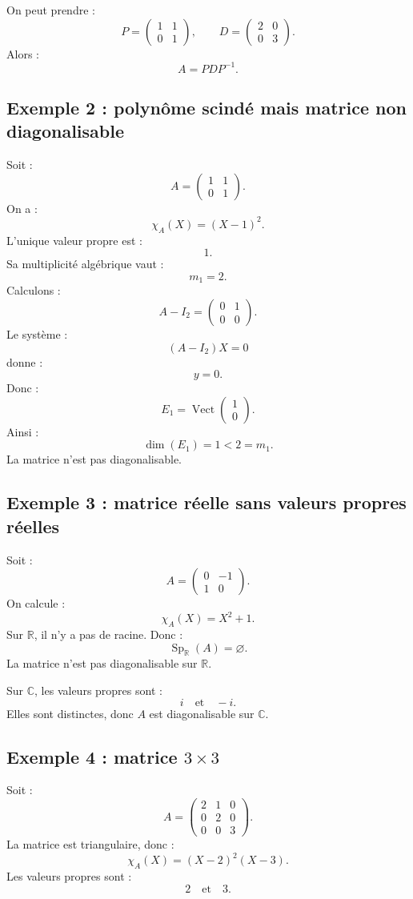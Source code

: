 \documentclass[11pt,a4paper]{article}
\newcommand{\R}{\mathbb R}
\newcommand{\C}{\mathbb C}
\newcommand{\Vect}{\operatorname{Vect}}
\newcommand{\Sp}{\operatorname{Sp}}
\begin{document}
On peut prendre :
\[
P=
\begin{pmatrix}
1&1\\
0&1
\end{pmatrix},
\qquad
D=
\begin{pmatrix}
2&0\\
0&3
\end{pmatrix}.
\]
Alors :
\[
A=PDP^{-1}.
\]

\subsection{Exemple 2 : polynôme scindé mais matrice non diagonalisable}

Soit :
\[
A=
\begin{pmatrix}
1&1\\
0&1
\end{pmatrix}.
\]
On a :
\[
\chi_A(X)=(X-1)^2.
\]
L'unique valeur propre est :
\[
1.
\]
Sa multiplicité algébrique vaut :
\[
m_1=2.
\]
Calculons :
\[
A-I_2=
\begin{pmatrix}
0&1\\
0&0
\end{pmatrix}.
\]
Le système :
\[
(A-I_2)X=0
\]
donne :
\[
y=0.
\]
Donc :
\[
E_1=\Vect
\begin{pmatrix}
1\\0
\end{pmatrix}.
\]
Ainsi :
\[
\dim(E_1)=1<2=m_1.
\]
La matrice n'est pas diagonalisable.

\subsection{Exemple 3 : matrice réelle sans valeurs propres réelles}

Soit :
\[
A=
\begin{pmatrix}
0&-1\\
1&0
\end{pmatrix}.
\]
On calcule :
\[
\chi_A(X)=X^2+1.
\]
Sur \(\R\), il n'y a pas de racine.  
Donc :
\[
\Sp_\R(A)=\varnothing.
\]
La matrice n'est pas diagonalisable sur \(\R\).

Sur \(\C\), les valeurs propres sont :
\[
i
\quad\text{et}\quad
-i.
\]
Elles sont distinctes, donc \(A\) est diagonalisable sur \(\C\).

\subsection{Exemple 4 : matrice \(3\times3\)}

Soit :
\[
A=
\begin{pmatrix}
2&1&0\\
0&2&0\\
0&0&3
\end{pmatrix}.
\]
La matrice est triangulaire, donc :
\[
\chi_A(X)=(X-2)^2(X-3).
\]
Les valeurs propres sont :
\[
2
\quad\text{et}\quad
3.
\]
\end{document}
